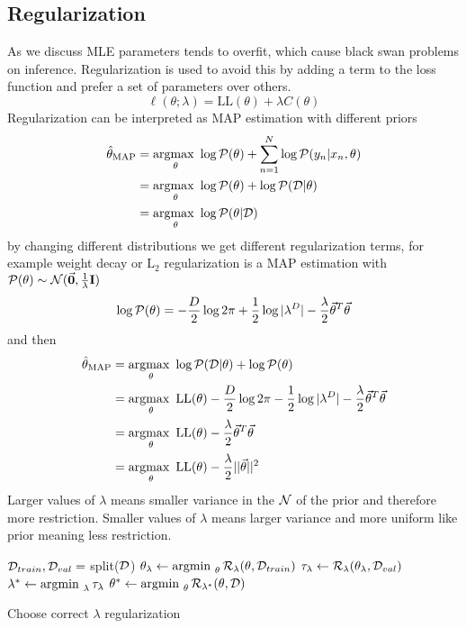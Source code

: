 \documentclass[../../main.tex]{subfiles}
\begin{document}
\subsection{Regularization}
As we discuss MLE parameters tends to overfit, which cause black swan problems on inference. Regularization is used to avoid this by adding a term to the loss function and prefer a set of parameters over others.
\begin{equation*}
    \ell(\theta;\lambda) = \mathrm{LL}(\theta) + \lambda C(\theta)
\end{equation*}
Regularization can be interpreted as MAP estimation with different priors
\begin{align*}
    \hat{\theta}_{\mathrm{MAP}} &= \operatorname*{argmax\text{ }}_\theta \log\mathcal{P}(\theta) +\sum_{n=1}^N \log\mathcal{P}(y_n|x_n,\theta)\\
    &= \operatorname*{argmax\text{ }}_\theta \log\mathcal{P}(\theta) + \log\mathcal{P}(\mathcal{D}|\theta)\\
    &= \operatorname*{argmax\text{ }}_\theta \log\mathcal{P}(\theta|\mathcal{D})
\end{align*}
by changing different distributions we get different regularization terms, for example weight decay or $\mathrm{L}_2$ regularization is a MAP estimation with $\p(\theta)\sim \normal(\vec{0},\frac{1}{\lambda}\mat{I})$
\begin{equation*}
    \log\p(\theta) = -\frac{D}{2}\log 2\pi + \frac{1}{2}\log |\lambda^D|- \frac{\lambda}{2}\vec{\theta}^T\vec{\theta}
\end{equation*}
and then
\begin{align*}
    \hat{\theta}_{\mathrm{MAP}}
    &= \argmax_\theta \log\p(\D|\theta)+\log\p(\theta)\\
    &= \argmax_\theta \mathrm{LL}(\theta) -\frac{D}{2}\log 2\pi - \frac{1}{2}\log |\lambda^D|- \frac{\lambda}{2}\vec{\theta}^T\vec{\theta}\\
    &= \argmax_\theta \mathrm{LL}(\theta) - \frac{\lambda}{2}\vec{\theta}^T\vec{\theta}\\
    &= \argmax_\theta \mathrm{LL}(\theta) - \frac{\lambda}{2}||\vec{\theta}||^2\\
\end{align*}
Larger values of $\lambda$ means smaller variance in the $\mathcal{N}$ of the prior and therefore more restriction. Smaller values of $\lambda$ means larger variance and more uniform like prior meaning less restriction.

\begin{algorithm}[H]
\begin{algorithmic}
\State $\mathcal{D}_{train}, \mathcal{D}_{val}=$ split($\mathcal{D}$)
\For{$\lambda \in \Lambda$}
    \State $\theta_\lambda \leftarrow \operatorname*{argmin\text{ }}_\theta \mathcal{R}_\lambda(\theta,\mathcal{D}_{train})$
    \State $\tau_\lambda \leftarrow \mathcal{R}_\lambda(\theta_\lambda,\mathcal{D}_{val}) $
\EndFor
\State $\lambda^* \leftarrow \operatorname*{argmin\text{ }}_\lambda \tau_{\lambda}$
\State $\theta^* \leftarrow \operatorname*{argmin\text{ }}_\theta \mathcal{R}_{\lambda^*}(\theta,\mathcal{D})$
\end{algorithmic}
\caption{Choose correct $\lambda$ regularization}
\end{algorithm}
\end{document}
